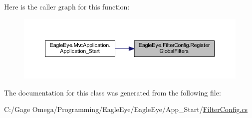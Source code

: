 Here is the caller graph for this function\+:\nopagebreak
\begin{figure}[H]
\begin{center}
\leavevmode
\includegraphics[width=350pt]{class_eagle_eye_1_1_filter_config_a95dcc0b5bd9bab3b88294d176c4db95f_icgraph}
\end{center}
\end{figure}


The documentation for this class was generated from the following file\+:\begin{DoxyCompactItemize}
\item 
C\+:/\+Gage Omega/\+Programming/\+Eagle\+Eye/\+Eagle\+Eye/\+App\+\_\+\+Start/\mbox{\hyperlink{_filter_config_8cs}{Filter\+Config.\+cs}}\end{DoxyCompactItemize}
